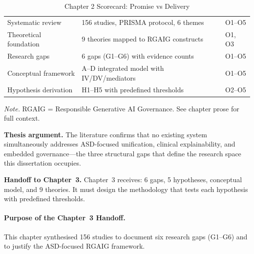 {\tablestripes\tablefontsize
\begin{xltabular}{\textwidth}{@{} >{\raggedright\arraybackslash}p{5.4cm} p{7.5cm} >{\centering\arraybackslash}p{1.5cm} @{}}
\caption[Chapter 2 Scorecard]{Chapter 2 Scorecard: Promise vs Delivery}\label{tab:ch2_scorecard} \\
\toprule
{} &  &  \\
\midrule
\endfirsthead
\endhead
\bottomrule
\endlastfoot
Systematic review & 156 studies, PRISMA protocol, 6 themes & O1--O5 \\
\addlinespace
Theoretical foundation & 9 theories mapped to RGAIG constructs & O1, O3 \\
\addlinespace
Research gaps & 6 gaps (G1--G6) with evidence counts & O1--O5 \\
\addlinespace
Conceptual framework & A--D integrated model with IV/DV/mediators & O1--O5 \\
\addlinespace
Hypothesis derivation & H1--H5 with predefined thresholds & O2--O5 \\
\end{xltabular}}
\vspace{0.3em}\noindent\textit{Note.} RGAIG = Responsible Generative AI Governance. See chapter prose for full context.

\noindent\textbf{Thesis argument.} The literature confirms that no existing system simultaneously addresses ASD-focused unification, clinical explainability, and embedded governance---the three structural gaps that define the research space this dissertation occupies.

\noindent\textbf{Handoff to Chapter~3.} Chapter~3 receives: 6 gaps, 5 hypotheses, conceptual model, and 9 theories. It must design the methodology that tests each hypothesis with predefined thresholds.


\paragraph{Purpose of the Chapter~3 Handoff.}
This chapter synthesised 156 studies to document six research gaps (G1--G6) and to justify the ASD-focused RGAIG framework.

